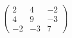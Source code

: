 \documentclass[preview]{standalone}
\begin{document}
\begin{align*}
\begin{pmatrix}2 & 4 & -2\\4 & 9 & -3\\-2 & -3 & 7\end{pmatrix}
\end{align*}
\end{document}
